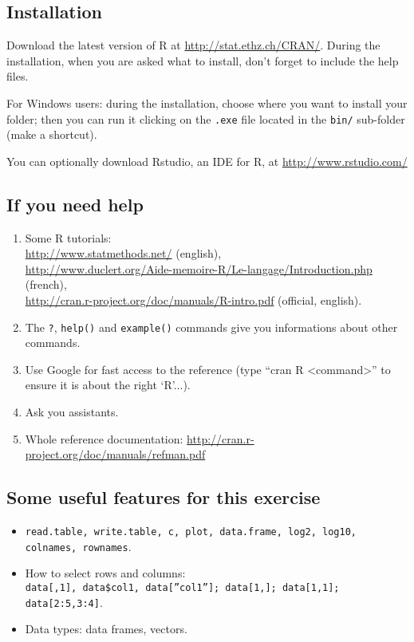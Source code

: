 \documentclass[a4paper,11pt]{article}
\begin{document}
\subsection{Installation}
Download the latest version of R at \url{http://stat.ethz.ch/CRAN/}. During the installation, when you are asked what to install, don't forget to include the help files.

For Windows users: during the installation, choose where you want to install your folder; then you can run it clicking on the \texttt{.exe} file located in the \texttt{bin/} sub-folder (make a shortcut).

You can optionally download Rstudio, an IDE for R, at \url{http://www.rstudio.com/}
\subsection{If you need help}
\begin{enumerate}
\item Some R tutorials: \\
      \url{http://www.statmethods.net/} (english),\\
      \url{http://www.duclert.org/Aide-memoire-R/Le-langage/Introduction.php} (french), \\
      \url{http://cran.r-project.org/doc/manuals/R-intro.pdf} (official, english).
\item The \texttt{?}, \texttt{help()} and \texttt{example()} commands give you informations about other commands.
\item Use Google for fast access to the reference (type ``cran R <command>'' to ensure it is about the right `R'...).
\item Ask you assistants.
\item Whole reference documentation: \url{http://cran.r-project.org/doc/manuals/refman.pdf}
\end{enumerate}

\subsection{Some useful features for this exercise}
\begin{itemize}
\item \texttt{read.table, write.table, c, plot, data.frame, log2, log10, colnames, rownames}.
\item How to select rows and columns:\\ \texttt{data[,1], data\$col1, data[''col1'']; data[1,]; data[1,1]; data[2:5,3:4]}.
\item Data types: data frames, vectors.
\end{itemize}
\end{document}
